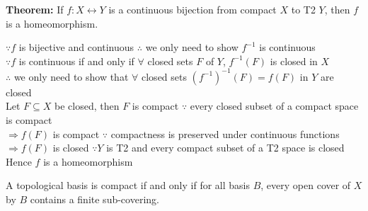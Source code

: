 \documentclass{article}
\begin{document}
\textbf{Theorem:} If $f: X \leftrightarrow Y$ is a continuous bijection from compact $X$ to T2 $Y$, then $f$ is a homeomorphism.
\begin{tcolorbox}[colback=lightgray!10,colframe=lightgray!10, fontupper=\linespread{1.5}\selectfont]
	$\because f$ is bijective and continuous $\therefore$ we only need to show $f^{-1}$ is continuous \\
	$\because f$ is continuous if and only if $\forall$ closed sets $F$ of $Y$, $f^{-1}(F)$ is closed in $X$ \\
	$\therefore$ we only need to show that $\forall$ closed sets $(f^{-1})^{-1}(F) = f(F)$ in $Y$ are closed \\
	Let $F \subseteq X$ be closed, then $F$ is compact $\because$ every closed subset of a compact space is compact \\
	$\Rightarrow f(F)$ is compact $\because$ compactness is preserved under continuous functions \\
	$\Rightarrow f(F)$ is closed $\because Y$ is T2 and every compact subset of a T2 space is closed \\
	Hence $f$ is a homeomorphism
\end{tcolorbox}

A topological basis is compact if and only if for all basis $B$, every open cover of $X$ by $B$ contains a finite sub-covering.
\end{document}
